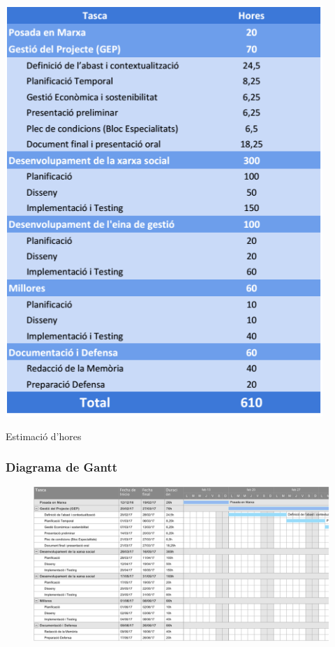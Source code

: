 \documentclass[11pt,catalan,listoffigures,listoftables]{tfgetsinf}
\begin{document}
\begin{table}[h]
\centering
\includegraphics[width=12cm]{images/taula1}
\caption[Taula 6.1]{Estimació d'hores}
\centering
\end{table}

\newpage

\subsubsection{Diagrama de Gantt}

\begin{figure}[h]
\includegraphics[width=14cm]{images/image2}
\centering
\end{figure}
\end{document}
